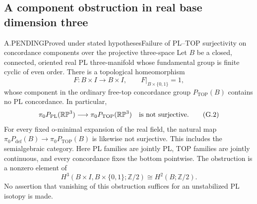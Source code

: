\subsection{A component obstruction in real base dimension three}

\begin{saresult}{A.PENDING}{Proved under stated hypotheses}{Failure of PL--TOP surjectivity on concordance components over the projective three-space}
Let $B$ be a closed, connected, oriented real PL three-manifold whose
fundamental group is finite cyclic of even order. There is a topological
homeomorphism
\[
 F:B\times I\longrightarrow B\times I,\qquad
 F|_{B\times\{0,1\}}=1,
                                                        \tag{G.1}
\]
whose component in the ordinary free-top concordance group
$P_{\mathrm{TOP}}(B)$ contains no PL concordance. In particular,
\[
 \pi_0P_{\mathrm{PL}}(\mathbb {RP}^3)\longrightarrow
 \pi_0P_{\mathrm{TOP}}(\mathbb {RP}^3)
 \quad\hbox{is not surjective}.                         \tag{G.2}
\]
For every fixed o-minimal expansion of the real field, the natural map
$\pi_0P_{\mathrm{def}}(B)\to\pi_0P_{\mathrm{TOP}}(B)$ is likewise
not surjective. This includes the semialgebraic category.
Here PL families are jointly PL, TOP families are jointly continuous,
and every concordance fixes the bottom pointwise. The obstruction is a
nonzero element of
\[
 H^3(B\times I,B\times\{0,1\};\mathbb Z/2)
       \cong H^2(B;\mathbb Z/2).
                                                        \tag{G.3}
\]
No assertion that vanishing of this obstruction suffices for an
unstabilized PL isotopy is made.
\end{saresult}
